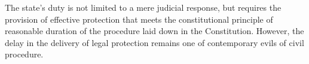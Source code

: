 The state's duty is not limited to a mere judicial response, but requires the provision of effective protection that meets the constitutional principle of reasonable duration of the procedure laid down in the Constitution. However, the delay in the delivery of legal protection remains one of contemporary evils of civil procedure.